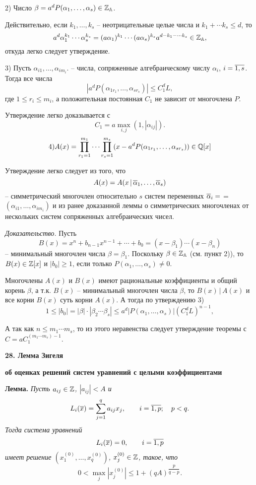 2) Число $\beta = a^d P(\alpha_1, \dots, \alpha_s) \in \Bbb
Z_{\Bbb A}$.

Действительно, если $k_1, \dots, k_s$ -- неотрицательные целые
числа и $k_1+ \cdots k_s \le d$, то
$$
a^d \alpha_1^{k_1} \cdots \alpha_s^{k_s} = (a \alpha_1)^{k_1}
\cdots (a \alpha_s)^{k_s}a^{d-k_1- \cdots k_s} \in \Bbb Z_{\Bbb
A},
$$
откуда легко следует утверждение. \vskip 5mm

3) Пусть $\alpha_{i1}, \dots, \alpha_{im_i}$. -- числа,
сопряженные алгебраическому числу   $\alpha_i$, $i= \overline{1,s}$.
Тогда все числа
$$
|a^dP(\alpha_{1r_1}, \dots, \alpha_{sr_s})| \le C_1^d L,
$$
где $1 \le r_i \le m_i$, а положительная постоянная  $C_1$ не
зависит от многочлена $P$. \vskip 5mm

Утверждение легко доказывается с
$$ C_1= a \max_{i,j} (1, |\alpha_{ij}|).$$
$$
4) A(x)= \prod_{r_1=1}^{m_1} \cdots \prod_{r_s=1}^{m_s}
(x-a^dP(\alpha_{1r_1}, \dots, \alpha_{sr_s})) \in \Bbb Q [x]
$$

Утверждение легко следует из того, что
$$ A(x) = A(x \,| \, \overline {\alpha}_1, \dots, \overline {\alpha}_s) $$
-- симметрический многочлен относительно $s$  систем переменных
$\overline{\alpha}_i=$     \linebreak =$ (\alpha_{i1}, \dots,
\alpha_{im_i})$ и из ранее доказанной леммы о симметрических
многочленах от нескольких систем сопряженных алгебраических чисел.

\emph{Доказательство.} Пусть
$$
B(x)= x^n+b_{n-1}x^{n-1}+ \cdots +b_0 = (x- \beta_1) \cdots (x-
\beta_n)
$$
-- минимальный многочлен числа $\beta = \beta_1$. Поскольку $\beta
\in \Bbb Z_{\Bbb A}$ (см. пункт 2)), то $B(x) \in \Bbb Z [x]$ и
$|b_0| \ge 1$, если только $P(\alpha_1, \dots, \alpha_s) \ne 0$.

Многочлены $A(x)$  и $B(x)$  имеют рациональные коэффициенты и
общий корень $\beta$,  а т.к. $B(x)$ -- минимальный многочлен
числа $\beta$,    то $B(x) \,| \, A(x)$  и все корни $B(x)$  суть
корни $A(x)$. А тогда по утверждению 3)
$$
1 \le |b_0| = |\beta| \cdot |\beta_2 \cdots \beta_s| \le
a^d|P(\alpha_1, \dots, \alpha_s)| ( C_1^d L)^{n-1},
$$

А так как $n \le m_1 \cdots m_s$, то из этого неравенства следует
утверждение теоремы с $C=a C_1^{(m_1 \cdots m_s)-1}$.



\vskip 5mm \centerline{\bf {28. Лемма Зигеля}  } \centerline{\bf
{об оценках решений систем уравнений с целыми коэффициентами}}
\vskip 5mm

{\bf Лемма.} {\it Пусть $a_{ij} \in \Bbb Z$, $|a_{ij}| < A$  и
$$
L_i(\overline x)= \sum_{j=1}^q a_{ij}x_j, \qquad  i= \overline {1,p}; \quad
p<q.
$$
Тогда система уравнений
$$
L_i(\overline x)=0, \qquad i= \overline {1,p}
$$
имеет решение $(x_1^{(0)}, \dots, x_q^{(0)})$, $x_j^{(0)} \in \Bbb
Z$, такое, что}
$$
0< \max_j |x_j^{(0)}| \le 1 + (qA)^{\dfrac p{q-p}}.
$$

